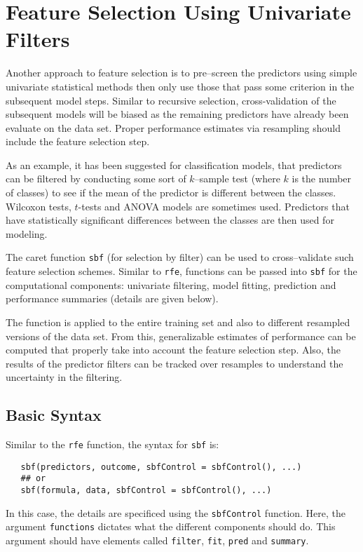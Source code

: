 \documentclass[12pt]{article}
\begin{document}
\clearpage

\section{Feature Selection Using Univariate Filters}

Another approach to feature selection is to pre--screen the predictors using simple univariate statistical methods then only use those that pass some criterion in the subsequent model steps. Similar to recursive selection, cross-validation of the subsequent models will be biased as the remaining predictors have already been evaluate on the data set. Proper performance estimates via resampling should include the feature selection step.

As an example, it has been suggested for classification models, that predictors can be filtered by conducting some sort of $k$--sample test (where $k$ is the number of classes) to see if the mean of the predictor is different between the classes. Wilcoxon tests, $t$-tests and ANOVA models are sometimes used. Predictors that have statistically significant differences between the classes are then used for modeling.

The caret function \texttt{sbf} (for selection by filter) can be used
to cross--validate such feature selection schemes. Similar to
\texttt{rfe}, functions can be passed into \texttt{sbf} for the
computational components: univariate filtering, model fitting, prediction and performance summaries (details are given below).

The function is applied to the entire training set and also to different resampled versions of the data set. From this, generalizable estimates of performance can be computed that properly take into account the feature selection step. Also, the results of the predictor filters can be tracked over resamples to understand the uncertainty in the filtering.

\subsection{Basic Syntax}

Similar to the \texttt{rfe} function, the syntax for \texttt{sbf} is:
\begin{Verbatim}
   sbf(predictors, outcome, sbfControl = sbfControl(), ...)
   ## or 
   sbf(formula, data, sbfControl = sbfControl(), ...)
\end{Verbatim}
In this case, the details are specificed using the \texttt{sbfControl}
function. Here, the argument \texttt{functions} dictates what the
different components should do. This argument should have elements
called \texttt{filter}, \texttt{fit}, \texttt{pred} and \texttt{summary}.
\end{document}
